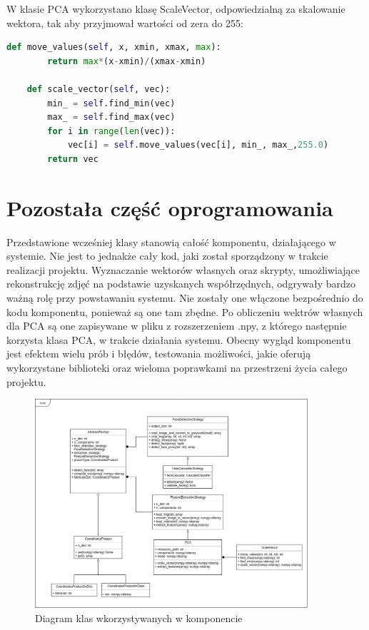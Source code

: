 \documentclass[oneside, eng]{mgr}
\begin{document}
W klasie PCA wykorzystano klasę ScaleVector, odpowiedzialną za skalowanie wektora, tak aby przyjmował wartości od zera do 255:

\begin{lstlisting}[language=Python]
    def move_values(self, x, xmin, xmax, max):
        return max*(x-xmin)/(xmax-xmin)

    def scale_vector(self, vec):
        min_ = self.find_min(vec)
        max_ = self.find_max(vec)
        for i in range(len(vec)):
            vec[i] = self.move_values(vec[i], min_, max_,255.0)
        return vec

\end{lstlisting}

\section{Pozostała część oprogramowania}
Przedstawione wcześniej klasy stanowią całość komponentu, działającego w systemie. Nie jest to jednakże cały kod, jaki został sporządzony w trakcie realizacji projektu. Wyznaczanie wektorów własnych oraz skrypty, umożliwiające rekonstrukcję zdjęć na podstawie uzyskanych współrzędnych, odgrywały bardzo ważną rolę przy powstawaniu systemu. Nie zostały one włączone bezpośrednio do kodu komponentu, ponieważ są one tam zbędne. Po obliczeniu wektrów własnych dla PCA są one zapisywane w pliku z rozszerzeniem .npy, z którego następnie korzysta klasa PCA, w trakcie działania systemu. Obecny wygląd komponentu jest efektem wielu prób i błędów, testowania możliwości, jakie oferują wykorzystane biblioteki oraz wieloma poprawkami na przestrzeni życia całego projektu.

\begin{figure}
\centering
	\includegraphics[width=0.90\textwidth]{img/Diagram.jpg}\par\vspace{1cm}
\caption{Diagram klas wkorzystywanych w komponencie}
	\label{fig:diagram_klas}
\end{figure}
\end{document}
